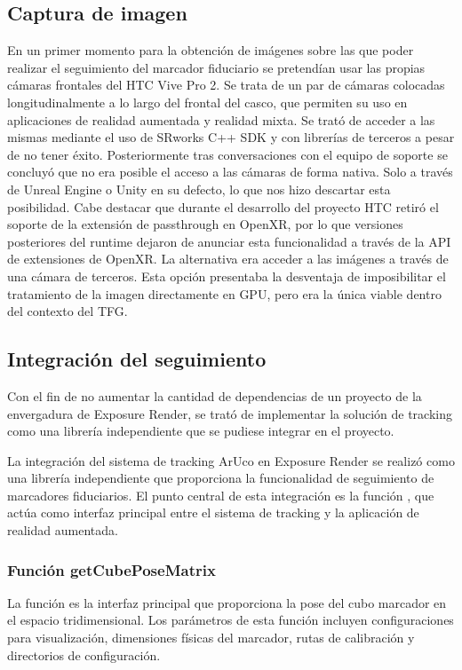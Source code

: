 \subsection{Captura de imagen}
\label{subsec:captura_imagen}
En un primer momento para la obtención de imágenes sobre las que poder realizar el seguimiento del marcador fiduciario se pretendían usar las propias cámaras frontales del HTC Vive Pro 2. Se trata de un par de cámaras colocadas longitudinalmente a lo largo del frontal del casco, que permiten su uso en aplicaciones de realidad aumentada y realidad mixta.
Se trató de acceder a las mismas mediante el uso de SRworks C++ SDK y con librerías de terceros a pesar de no tener éxito. Posteriormente tras conversaciones con el equipo de soporte se concluyó que no era posible el acceso a las cámaras de forma nativa. Solo a través de Unreal Engine o Unity en su defecto, lo que nos hizo descartar esta posibilidad. Cabe destacar que durante el desarrollo del proyecto HTC retiró el soporte de la extensión de passthrough en OpenXR, por lo que versiones posteriores del runtime dejaron de anunciar esta funcionalidad a través de la API de extensiones de OpenXR.
La alternativa era acceder a las imágenes a través de una cámara de terceros. Esta opción presentaba la desventaja de imposibilitar el tratamiento de la imagen directamente en GPU, pero era la única viable dentro del contexto del TFG.

\subsection{Integración del seguimiento}
Con el fin de no aumentar la cantidad de dependencias de un proyecto de la envergadura de Exposure Render, se trató de implementar la solución de tracking como una librería independiente que se pudiese integrar en el proyecto.

La integración del sistema de tracking ArUco en Exposure Render se realizó como una librería independiente que proporciona la funcionalidad de seguimiento de marcadores fiduciarios. El punto central de esta integración es la función , que actúa como interfaz principal entre el sistema de tracking y la aplicación de realidad aumentada.

\subsubsection{Función getCubePoseMatrix}
La función  es la interfaz principal que proporciona la pose del cubo marcador en el espacio tridimensional. Los parámetros de esta función incluyen configuraciones para visualización, dimensiones físicas del marcador, rutas de calibración y directorios de configuración.

